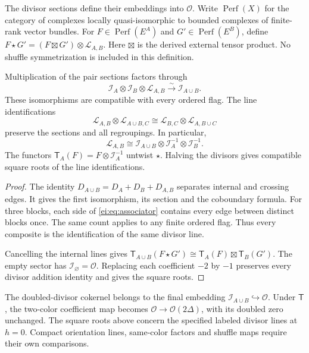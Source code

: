 The divisor sections define their embeddings into $\mathcal O$.
Write $\operatorname{Perf}(X)$ for the category of complexes locally
quasi-isomorphic to bounded complexes of finite-rank vector bundles.
For $F\in\operatorname{Perf}(E^A)$ and
$G'\in\operatorname{Perf}(E^B)$, define
$F\star G'=(F\boxtimes G')\otimes\mathcal L_{A,B}$.
Here $\boxtimes$ is the derived external tensor product.
No shuffle symmetrization is included in this definition.

\begin{proposition}\label{ei:prop:flags}
Multiplication of the pair sections factors through
\[
 \mathcal I_A\otimes\mathcal I_B\otimes\mathcal L_{A,B}
       \xrightarrow{\sim}\mathcal I_{A\cup B}.
\]
These isomorphisms are compatible with every ordered flag.
The line identifications
\begin{equation}\label{ei:eq:associator}
 \mathcal L_{A,B}\otimes\mathcal L_{A\cup B,C}
 \cong
 \mathcal L_{B,C}\otimes\mathcal L_{A,B\cup C}
\end{equation}
preserve the sections and all regroupings. In particular,
\[
 \mathcal L_{A,B}
 \cong\mathcal I_{A\cup B}\otimes\mathcal I_A^{-1}
                         \otimes\mathcal I_B^{-1}.
\]
The functors $\mathsf T_A(F)=F\otimes\mathcal I_A^{-1}$
untwist $\star$. Halving the divisors gives compatible square
roots of the line identifications.
\end{proposition}

\begin{proof}
The identity
$D_{A\cup B}=D_A+D_B+D_{A,B}$ separates internal and crossing edges.
It gives the first isomorphism, its section and the coboundary formula.
For three blocks, each side of \eqref{ei:eq:associator} contains
every edge between distinct blocks once.
The same count applies to any finite ordered flag.
Thus every composite is the identification of the same divisor line.

Cancelling the internal lines gives
$\mathsf T_{A\cup B}(F\star G')
\cong\mathsf T_A(F)\boxtimes\mathsf T_B(G')$.
The empty sector has $\mathcal I_\varnothing=\mathcal O$.
Replacing each coefficient $-2$ by $-1$ preserves every divisor
addition identity and gives the square roots.
\end{proof}

The doubled-divisor cokernel belongs to the final embedding
$\mathcal I_{A\cup B}\hookrightarrow\mathcal O$.
Under $\mathsf T$, the two-color coefficient map becomes
$\mathcal O\to\mathcal O(2\Delta)$, with its doubled zero unchanged.
The square roots above concern the specified labeled divisor lines
at $h=0$. Compact orientation lines, same-color factors and
shuffle maps require their own comparisons.

